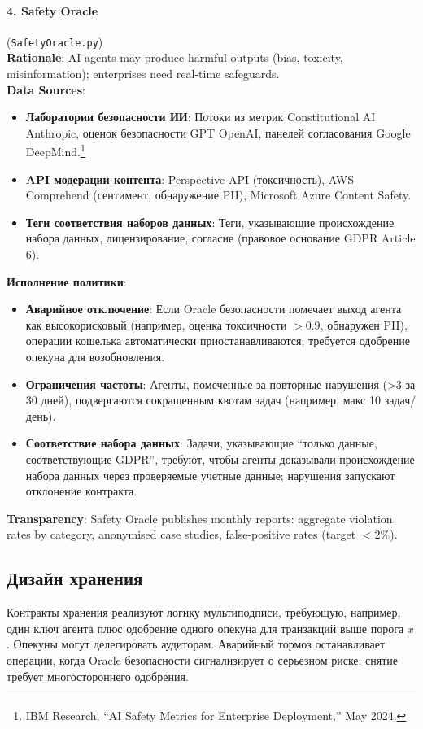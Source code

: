 \documentclass[11pt]{article}
\begin{document}
\paragraph{4. Safety Oracle} (\texttt{SafetyOracle.py})\\
\textbf{Rationale}: AI agents may produce harmful outputs (bias, toxicity, misinformation); enterprises need real-time safeguards.\\
\textbf{Data Sources}:
\begin{itemize}[noitemsep]
  \item \textbf{Лаборатории безопасности ИИ}: Потоки из метрик Constitutional AI Anthropic, оценок безопасности GPT OpenAI, панелей согласования Google DeepMind.\footnote{IBM Research, ``AI Safety Metrics for Enterprise Deployment,'' May 2024.}
  \item \textbf{API модерации контента}: Perspective API (токсичность), AWS Comprehend (сентимент, обнаружение PII), Microsoft Azure Content Safety.
  \item \textbf{Теги соответствия наборов данных}: Теги, указывающие происхождение набора данных, лицензирование, согласие (правовое основание GDPR Article 6).
\end{itemize}
\textbf{Исполнение политики}:
\begin{itemize}[noitemsep]
  \item \textbf{Аварийное отключение}: Если Oracle безопасности помечает выход агента как высокорисковый (например, оценка токсичности $>0.9$, обнаружен PII), операции кошелька автоматически приостанавливаются; требуется одобрение опекуна для возобновления.
  \item \textbf{Ограничения частоты}: Агенты, помеченные за повторные нарушения (>3 за 30 дней), подвергаются сокращенным квотам задач (например, макс 10 задач/день).
  \item \textbf{Соответствие набора данных}: Задачи, указывающие ``только данные, соответствующие GDPR'', требуют, чтобы агенты доказывали происхождение набора данных через проверяемые учетные данные; нарушения запускают отклонение контракта.
\end{itemize}
\textbf{Transparency}: Safety Oracle publishes monthly reports: aggregate violation rates by category, anonymised case studies, false-positive rates (target $<2\%$).

\subsection{Дизайн хранения}
Контракты хранения реализуют логику мультиподписи, требующую, например, один ключ агента плюс одобрение одного опекуна для транзакций выше порога $x$. Опекуны могут делегировать аудиторам. Аварийный тормоз останавливает операции, когда Oracle безопасности сигнализирует о серьезном риске; снятие требует многостороннего одобрения.
\end{document}
